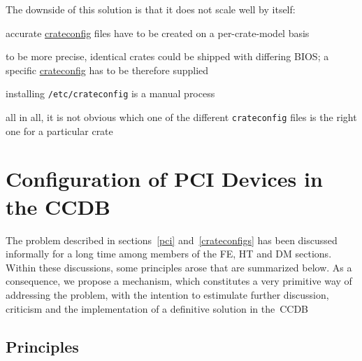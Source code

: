 \documentclass[12pt,a4paper]{article}
\newcommand\fname[1]{\texttt{#1}}
\begin{document}
The downside of this solution is that it does not scale well by itself:
\begin{compactitem}
\item accurate \url{crateconfig} files have to be created on
	a per-crate-model basis
\item to be more precise, identical crates could be shipped with
	differing BIOS; a specific \url{crateconfig} has to be
	therefore supplied
\item installing \fname{/etc/crateconfig} is a manual process
\item all in all, it is not obvious which one of the different \fname{crateconfig}
	files is the right one for a particular crate
\end{compactitem}

\section{Configuration of PCI Devices in the CCDB}

The problem described in sections~\ref{pci} and~\ref{crateconfigs} has been
discussed informally for a long time among members of the FE, HT
and DM sections. Within these discussions, some principles arose that
are summarized below. As a consequence, we propose a mechanism,
which constitutes a very primitive way of addressing
the problem, with the intention to estimulate further discussion,
criticism and the implementation of a definitive solution in the~CCDB

\subsection{Principles}
\end{document}
